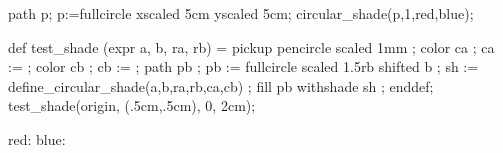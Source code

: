 
	path p;
	p:=fullcircle xscaled 5cm yscaled 5cm;
	circular_shade(p,1,red,blue);
\stopuseMPgraphic

\definecolor[a][red]
\definecolor[b][blue]
\definecolor[c][darkred]

  def test_shade (expr a, b, ra, rb) =
	pickup pencircle scaled 1mm ;
	color ca ; ca :=  ;
	color cb ; cb :=  ;
	path pb ; pb := fullcircle scaled 1.5rb shifted b ;
	sh := define_circular_shade(a,b,ra,rb,ca,cb) ;
	fill pb withshade sh ;
  enddef;
  test_shade(origin, (.5cm,.5cm), 0, 2cm);
\stopuseMPgraphic

red:  blue:
